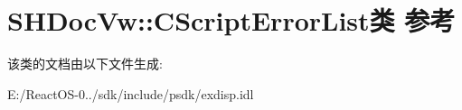 \hypertarget{class_s_h_doc_vw_1_1_c_script_error_list}{}\section{S\+H\+Doc\+Vw\+:\+:C\+Script\+Error\+List类 参考}
\label{class_s_h_doc_vw_1_1_c_script_error_list}


该类的文档由以下文件生成\+:\begin{DoxyCompactItemize}
\item 
E\+:/\+React\+O\+S-\/0../sdk/include/psdk/exdisp.\+idl\end{DoxyCompactItemize}
